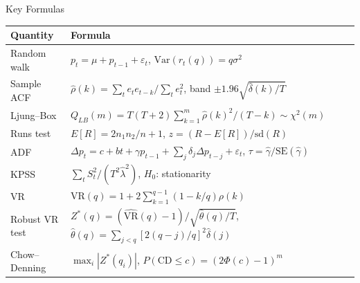 \begin{frame}{Key Formulas}
\itemsize{\small}
{\renewcommand{\arraystretch}{1.45}\begin{center}
\footnotesize
\begin{tabular}{ll}
\toprule
\textbf{Quantity} & \textbf{Formula} \\
\midrule
Random walk & $p_t = \mu + p_{t-1} + \varepsilon_t$, \quad $\mathrm{Var}(r_t(q)) = q\sigma^2$ \\
Sample ACF & $\hat\rho(k) = \sum_t e_te_{t-k}/\sum_t e_t^2$, \quad band $\pm 1.96\sqrt{\hat\delta(k)/T}$ \\
Ljung--Box & $Q_{LB}(m) = T(T+2)\sum_{k=1}^m \hat\rho(k)^2/(T-k) \sim \chi^2(m)$ \\
Runs test & $E[R] = 2n_1n_2/n + 1$, \quad $z = (R - E[R])/\mathrm{sd}(R)$ \\
ADF & $\Delta p_t = c + bt + \gamma p_{t-1} + \sum_j \delta_j\Delta p_{t-j} + \varepsilon_t$, \quad $\tau = \hat\gamma/\mathrm{SE}(\hat\gamma)$ \\
KPSS & $\sum_t S_t^2/(T^2\hat\lambda^2)$, \quad $H_0$: stationarity \\
VR & $\mathrm{VR}(q) = 1 + 2\sum_{k=1}^{q-1}(1 - k/q)\rho(k)$ \\
Robust VR test & $Z^*(q) = (\widehat{\mathrm{VR}}(q) - 1)/\sqrt{\hat\theta(q)/T}$, \quad $\hat\theta(q) = \sum_{j<q}[2(q-j)/q]^2\hat\delta(j)$ \\
Chow--Denning & $\max_i |Z^*(q_i)|$, \quad $P(\mathrm{CD} \le c) = (2\Phi(c) - 1)^m$ \\
\bottomrule
\end{tabular}
\end{center}
}
\end{frame}

